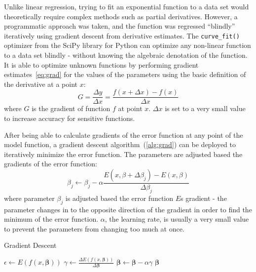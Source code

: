\documentclass[12pt]{mcmthesis}
\begin{document}
    Unlike linear regression, trying to fit an exponential function to a data set would theoretically require complex methods such as partial derivatives.
    However, a programmatic approach was taken, and the function was regressed ``blindly'' iteratively using gradient descent from derivative estimates.
    The \verb|curve_fit()| optimizer from the SciPy library for Python can optimize any non-linear function to a data set blindly - without knowing the algebraic denotation of the function.
    It is able to optimize unknown functions by performing gradient estimates~\eqref{eq:grad} for the values of the parameters using the basic definition of the derivative at a point $x$:
%
    \begin{equation}
        G = \frac{\Delta y}{\Delta x} = \frac{f(x + \Delta x) - f(x)}{\Delta x}
        \label{eq:grad}
    \end{equation}
%
    \noindent where $G$ is the gradient of function $f$ at point $x$.
    $\Delta x$ is set to a very small value to increase accuracy for sensitive functions.

    After being able to calculate gradients of the error function at any point of the model function, a gradient descent algorithm~(\ref{alg:grad}) can be deployed to iteratively minimize the error function.
    The parameters are adjusted based the gradients of the error function:
%
    \begin{equation}
        \beta_j \longleftarrow \beta_j - \alpha \frac{E(x, \beta + \Delta \beta_j) - E(x, \beta)}{\Delta \beta_j}
    \end{equation}
%
    \noindent where parameter $\beta_j$ is adjusted based the error function $E$\textquotesingle s gradient - the parameter changes in to the opposite direction of the gradient in order to find the minimum of the error function.
    $\alpha$, the learning rate, is usually a very small value to prevent the parameters from changing too much at once.

    \begin{algorithm}
        \caption{Gradient Descent}
        \label{alg:grad}
        \begin{algorithmic}
            \Repeat
                \State $\epsilon \gets E(f(x, \mathbf{\beta}))$  
                \State $\gamma \gets \frac{\Delta E(f(x, \mathbf{\beta}))}{\Delta \mathbf{\beta}}$  
                \State $\mathbf{\beta} \gets \mathbf{\beta} - \alpha \gamma$  
            \State \Return $\mathbf{\beta}$ 
        \end{algorithmic}
    \end{algorithm}
\end{document}
